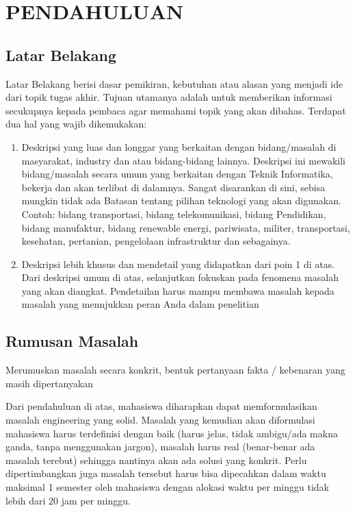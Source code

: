 \newpage
\chapter{PENDAHULUAN} \label{Bab I}

\section{Latar Belakang} \label{I.Latar Belakang}
Latar Belakang berisi dasar pemikiran, kebutuhan atau alasan yang menjadi ide dari topik tugas akhir. Tujuan utamanya adalah untuk memberikan informasi secukupnya kepada pembaca agar memahami topik yang akan dibahas. Terdapat dua hal yang wajib dikemukakan: \par

\begin{enumerate}[noitemsep]
	\item Deskripsi yang luas dan longgar yang berkaitan dengan bidang/masalah di masyarakat, industry dan atau bidang-bidang lainnya. Deskripsi ini mewakili bidang/masalah secara umum yang berkaitan dengan Teknik Informatika, bekerja dan akan terlibat di dalamnya. Sangat disarankan di sini, sebisa mungkin tidak ada Batasan tentang pilihan teknologi yang akan digunakan. Contoh: bidang transportasi, bidang telekomunikasi, bidang Pendidikan, bidang manufaktur, bidang renewable energi, pariwisata, militer, transportasi, kesehatan, pertanian, pengelolaan infrastruktur dan sebagainya.
	\item Deskripsi lebih khusus dan mendetail yang didapatkan dari poin 1 di atas. Dari deskripsi umum di atas, selanjutkan fokuskan pada fenomena masalah yang akan diangkat. Pendetailan harus mampu membawa masalah kepada masalah yang mennjukkan peran Anda dalam penelitian 
\end{enumerate}

\section{Rumusan Masalah} \label{I.Rumusan Masalah}
Merumuskan masalah secara konkrit, bentuk pertanyaan fakta / kebenaran yang masih dipertanyakan \par

Dari pendahuluan di atas, mahasiswa diharapkan dapat memformulasikan masalah engineering yang solid. Masalah yang kemudian akan diformulasi mahasiswa harus terdefinisi dengan baik (harus jelas, tidak ambigu/ada makna ganda, tanpa menggunakan jargon), masalah harus real (benar-benar ada masalah terebut) sehingga nantinya akan ada solusi yang konkrit. Perlu dipertimbangkan juga masalah tersebut harus bisa dipecahkan dalam waktu maksimal 1 semester oleh mahasiswa dengan alokasi waktu per minggu tidak lebih dari 20 jam per minggu. \par

